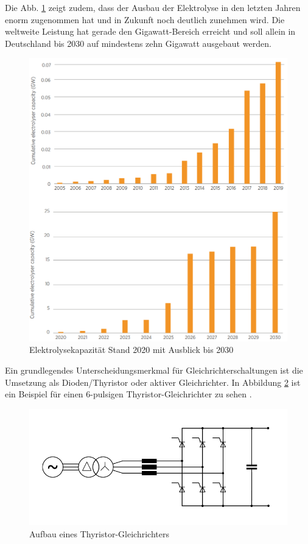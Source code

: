 Die Abb. \ref{fig:elycapacity} zeigt zudem, dass der Ausbau der Elektrolyse in den letzten Jahren enorm zugenommen hat und in Zukunft noch deutlich zunehmen wird. Die weltweite Leistung hat gerade den Gigawatt-Bereich erreicht und soll allein in Deutschland bis 2030 auf mindestens zehn Gigawatt ausgebaut werden.\\
	\begin{figure}[H]
		\centering
		\includegraphics[width=0.7\linewidth]{content/Grafiken/Ely_Capacity}
		\caption[Elektrolyse Kapazität bis 2030]{Elektrolysekapazität Stand 2020 mit Ausblick bis 2030 \cite{IRENA2020}}
		\label{fig:elycapacity}
	\end{figure}
Ein grundlegendes Unterscheidungsmerkmal für Gleichrichterschaltungen ist die Umsetzung als Dioden/Thyristor oder aktiver Gleichrichter. In Abbildung \ref{fig:thyristor} ist ein Beispiel für einen 6-pulsigen Thyristor-Gleichrichter zu sehen . 
	\begin{figure} [H]
		\centering
		\includegraphics[width=0.9\linewidth]{content/Grafiken/Thyristor}
		\caption{Aufbau eines Thyristor-Gleichrichters}
		\label{fig:thyristor}
	\end{figure}
